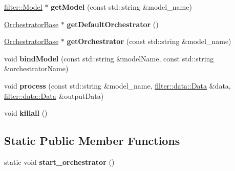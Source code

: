 \begin{DoxyCompactItemize}
\hyperlink{classfilter_1_1_model}{filter\+::\+Model} $\ast$ {\bfseries get\+Model} (const std\+::string \&model\+\_\+name)
\item 
\mbox{\label{classorchestrator_1_1_orchestrator_factory_a013e0703fa2922221b49d64cf2d12fb6}} 
\hyperlink{classorchestrator_1_1_orchestrator_base}{Orchestrator\+Base} $\ast$ {\bfseries get\+Default\+Orchestrator} ()
\item 
\mbox{\label{classorchestrator_1_1_orchestrator_factory_a6694ec866b7e8f3388d58fe2588d1d57}} 
\hyperlink{classorchestrator_1_1_orchestrator_base}{Orchestrator\+Base} $\ast$ {\bfseries get\+Orchestrator} (const std\+::string \&model\+\_\+name)
\item 
\mbox{\label{classorchestrator_1_1_orchestrator_factory_a0b9d2b9250dc151cba3cfb12cbee39f9}} 
void {\bfseries bind\+Model} (const std\+::string \&model\+Name, const std\+::string \&orchestrator\+Name)
\item 
\mbox{\label{classorchestrator_1_1_orchestrator_factory_afc39d75a249348ce2c1b3bb0f909de01}} 
void {\bfseries process} (const std\+::string \&model\+\_\+name, \hyperlink{classfilter_1_1data_1_1_data}{filter\+::data\+::\+Data} \&data, \hyperlink{classfilter_1_1data_1_1_data}{filter\+::data\+::\+Data} \&output\+Data)
\item 
\mbox{\label{classorchestrator_1_1_orchestrator_factory_ab86cb72d7aae4dd1825d79e66fb9f8b4}} 
void {\bfseries killall} ()
\end{DoxyCompactItemize}
\subsection*{Static Public Member Functions}
\begin{DoxyCompactItemize}
\item 
\mbox{\label{classorchestrator_1_1_orchestrator_factory_a0cf9e248743a85b0fc67a5eeab7d8fcc}} 
static void {\bfseries start\+\_\+orchestrator} ()
\end{DoxyCompactItemize}
